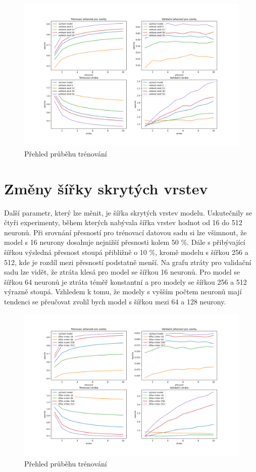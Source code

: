 \documentclass[FM,BP]{tulthesis}
\begin{document}
\begin{figure}[!htbp]
\centerline{\includegraphics[scale=.5]{training_course-margin.png}}
\caption{Přehled průběhu trénování}
\label{fig}
\end{figure}
\FloatBarrier

\section{Změny šířky skrytých vrstev}
Další parametr, který lze měnit, je šířka skrytých vrstev modelu. Uskutečnily se čtyři experimenty, během kterých nabývala šířka vrstev hodnot od 16 do 512 neuronů. Při srovnání přesností pro trénovací datovou sadu si lze všimnout, že model s 16 neurony dosahuje nejnižší přesnosti kolem 50 \%. Dále s přibývající šířkou výsledná přesnost stoupá přibližně o 10 \%, kromě modelu s šířkou 256 a 512, kde je rozdíl mezi přesností podstatně menší. Na grafu ztráty pro validační sadu lze vidět, že ztráta klesá pro model se šířkou 16 neuronů. Pro model se šířkou 64 neuronů je ztráta téměř konstantní a pro modely se šířkou 256 a 512 výrazně stoupá. Vzhledem k tomu, že modely s vyšším počtem neuronů mají tendenci se přeučovat zvolil bych model s šířkou mezi 64 a 128 neurony.

\begin{figure}[!htbp]
\centerline{\includegraphics[scale=.5]{training_course-width.png}}
\caption{Přehled průběhu trénování}
\label{fig}
\end{figure}
\FloatBarrier
\end{document}
